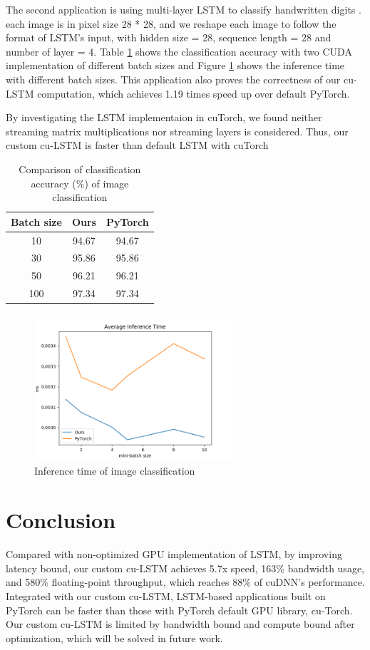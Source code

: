 \documentclass{article}
\begin{document}
The second application is using multi-layer LSTM to classify handwritten digits \cite{deng2012mnist}. each image is in pixel size 28 * 28, and we reshape each image to follow the format of LSTM's input, with hidden size = 28, sequence length = 28 and number of layer = 4. Table \ref{image-accuracy} shows the classification accuracy with two CUDA implementation of different batch sizes and Figure \ref{image-time} shows the inference time with different batch sizes. This application also proves the correctness of our cu-LSTM computation, which achieves 1.19 times speed up over default PyTorch.

By investigating the LSTM implementaion in cuTorch, we found neither streaming matrix multiplications nor streaming layers is considered. Thus, our custom cu-LSTM is faster than default LSTM with cuTorch

\begin{table}[H]
\centering
\caption{Comparison of classification accuracy (\%) of image classification}
\label{image-accuracy}
\begin{tabular}{@{}c|cc@{}}
\toprule
Batch size & Ours & PyTorch \\ \midrule
10 & 94.67 & 94.67 \\
30 & 95.86 & 95.86 \\
50 & 96.21 & 96.21 \\
100 & 97.34 & 97.34 \\ \bottomrule
\end{tabular}
\end{table}

\begin{figure}[H]
\centering
\includegraphics[width=0.65\textwidth]{image.png}
\caption{Inference time of image classification }
\label{image-time}
\end{figure}

\medskip

\section{Conclusion}

Compared with non-optimized GPU implementation of LSTM, by improving latency bound, our custom cu-LSTM achieves 5.7x speed, 163\% bandwidth usage, and 580\% floating-point throughput, which reaches 88\% of cuDNN's performance. Integrated with our custom cu-LSTM, LSTM-based applications built on PyTorch can be faster than those with PyTorch default GPU library, cu-Torch. Our custom cu-LSTM is limited by bandwidth bound and compute bound after optimization, which will be solved in future work.


\end{document}

